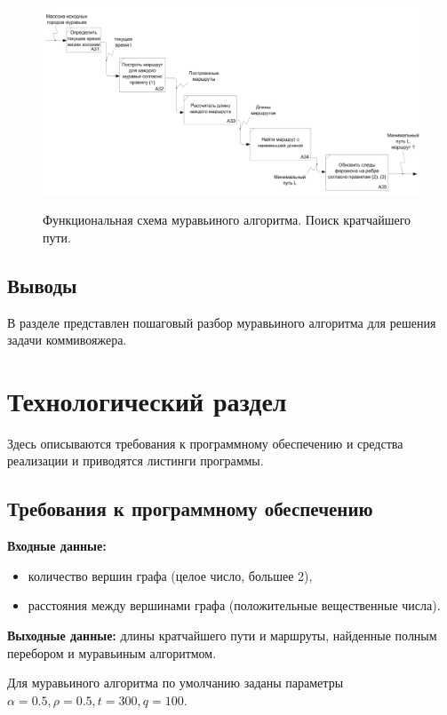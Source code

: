 \documentclass[a4paper,12pt]{article}
\begin{document}
\begin{figure}[h!]
\begin{center}
{\includegraphics[width = \textwidth]{img/n2.png}}
\caption{Функциональная схема муравьиного алгоритма. Поиск кратчайшего пути.}
\label{fig:n2}
\end{center}
\end{figure}

\subsection*{Выводы}

В разделе представлен пошаговый разбор
муравьиного алгоритма для решения задачи коммивояжера.


\newpage
\section{Технологический раздел}

Здесь описываются требования к программному 
обеспечению и средства реализации и приводятся листинги 
программы.

\subsection{Требования к программному обеспечению}

\begin{flushleft}
\textbf{Входные данные:} 
\begin{itemize}
\item количество вершин графа (целое число, большее 2),
\item расстояния между вершинами графа (положительные вещественные числа).
\end{itemize}
	
\textbf{Выходные данные:} длины кратчайшего пути и маршруты,
найденные полным перебором
и муравьиным алгоритмом.


Для муравьиного алгоритма по умолчанию заданы параметры $\alpha = 0.5, \rho = 0.5, \textit{t} = 300, \textit{q} = 100$.

\end{flushleft}
	
\end{document}
